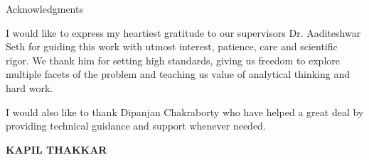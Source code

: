 \begin{center}
\LARGE{Acknowledgments} 
\end{center}

\vspace{0.5in}

I would like to express my heartiest gratitude to our supervisors Dr. Aaditeshwar Seth for guiding this work with utmost interest,
patience, care and scientific rigor. We thank him for setting high standards, giving us freedom to explore multiple facets of the problem and teaching us value of analytical thinking and hard work.

I would also like to thank Dipanjan Chakraborty who have helped a great deal by providing technical guidance and support whenever needed. 

\vspace{1.5in}

{\bfseries KAPIL THAKKAR}

